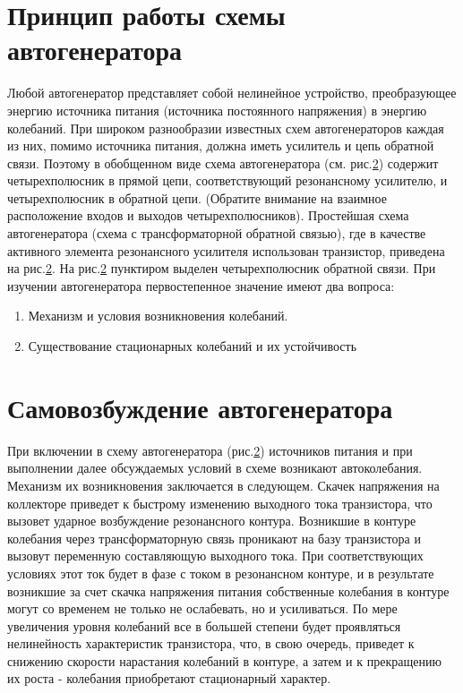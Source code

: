\section{Принцип работы схемы автогенератора}
Любой автогенератор представляет собой нелинейное устройство, преобразующее энергию источника питания (источника постоянного напряжения) в энергию колебаний. При широком разнообразии известных схем автогенераторов каждая из них, помимо источника питания, должна иметь усилитель и цепь обратной связи. Поэтому в обобщенном виде схема автогенератора (см. рис.\ref{}) содержит четырехполюсник в прямой цепи, соответствующий резонансному усилителю, и четырехполюсник в обратной цепи. (Обратите внимание на взаимное расположение входов и выходов четырехполюсников).
Простейшая схема автогенератора (схема с трансформаторной обратной связью), где в качестве активного элемента резонансного усилителя использован транзистор, приведена на рис.\ref{}. На рис.\ref{} пунктиром выделен четырехполюсник обратной связи.
При изучении автогенератора первостепенное значение имеют два вопроса:
\begin{enumerate}
\item Механизм и условия возникновения колебаний.
\item Существование стационарных колебаний и их устойчивость
\end{enumerate}

\section{Самовозбуждение автогенератора}
При включении в схему автогенератора (рис.\ref{}) источников питания и при выполнении далее обсуждаемых условий в схеме возникают автоколебания. Механизм их возникновения заключается в следующем. Скачек напряжения на коллекторе приведет к быстрому изменению выходного тока транзистора, что вызовет ударное возбуждение резонансного контура. Возникшие в контуре колебания через трансформаторную связь проникают на базу транзистора и вызовут переменную составляющую выходного тока. При соответствующих условиях этот ток будет в фазе с током в резонансном контуре, и в результате возникшие за счет скачка напряжения питания собственные колебания в контуре могут со временем не только не ослабевать, но и усиливаться. По мере увеличения уровня колебаний все в большей степени будет проявляться нелинейность характеристик транзистора, что, в свою очередь, приведет к снижению скорости нарастания колебаний в контуре, а затем и к прекращению их роста - колебания приобретают стационарный характер.

